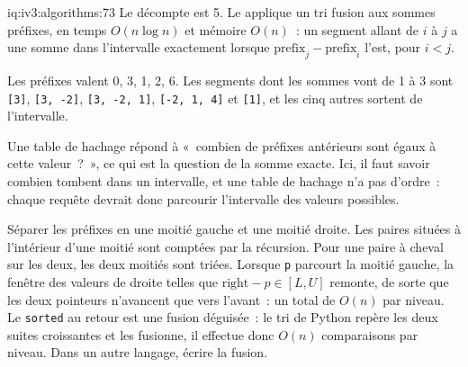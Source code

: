 \begin{solution}{iq:iv3:algorithms:73}
Le décompte est 5. Le  applique un tri fusion aux sommes préfixes, en temps $O(n \log n)$ et mémoire $O(n)$~: un segment allant de $i$ à $j$ a une somme dans l'intervalle exactement lorsque $\text{prefix}_j - \text{prefix}_i$ l'est, pour $i < j$.
\label{lst:iv3:al:rangesums}

Les préfixes valent 0, 3, 1, 2, 6. Les segments dont les sommes vont de 1 à 3 sont \texttt{[3]}, \texttt{[3, -2]}, \texttt{[3, -2, 1]}, \texttt{[-2, 1, 4]} et \texttt{[1]}, et les cinq autres sortent de l'intervalle.

Une table de hachage répond à «~combien de préfixes antérieurs sont égaux à cette valeur~?~», ce qui est la question de la somme exacte. Ici, il faut savoir combien tombent dans un intervalle, et une table de hachage n'a pas d'ordre~: chaque requête devrait donc parcourir l'intervalle des valeurs possibles.

Séparer les préfixes en une moitié gauche et une moitié droite. Les paires situées à l'intérieur d'une moitié sont comptées par la récursion. Pour une paire à cheval sur les deux, les deux moitiés sont triées. Lorsque \texttt{p} parcourt la moitié gauche, la fenêtre des valeurs de droite telles que $\text{right} - p \in [L, U]$ remonte, de sorte que les deux pointeurs n'avancent que vers l'avant~: un total de $O(n)$ par niveau. Le \texttt{sorted} au retour est une fusion déguisée~: le tri de Python repère les deux suites croissantes et les fusionne, il effectue donc $O(n)$ comparaisons par niveau. Dans un autre langage, écrire la fusion.

\end{solution}

